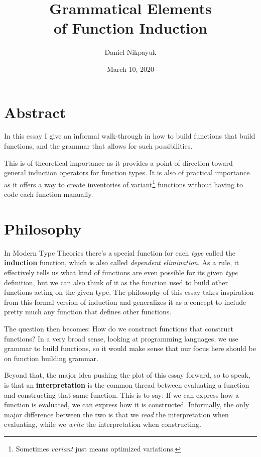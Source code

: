 \documentclass[twoside]{article}
\title{Grammatical Elements\\of Function Induction}
\author{Daniel Nikpayuk}
\date{March 10, 2020}
\newcommand{\strong}[1]{{\bfseries #1}}
\begin{document}
\maketitle
\thispagestyle{empty}

\section*{Abstract}

In this essay I give an informal walk-through in how to build functions that build functions, and the grammar
that allows for such possibilities.

This is of theoretical importance as it provides a point of direction toward general induction operators for function types.
It is also of practical importance as it offers a way to create inventories of variant\footnote{Sometimes \emph{variant}
just means optimized variations.} functions without having to code each function manually.

\section*{Philosophy}

In Modern Type Theories there's a special function for each \emph{type} called the \strong{induction} function, which
is also called \emph{dependent elimination}. As a rule, it effectively tells us what kind of functions are even possible
for its given \emph{type} definition, but we can also think of it as the function used to build other functions acting
on the given type. The philosophy of this essay takes inspiration from this formal version of induction and generalizes
it as a concept to include pretty much any function that defines other functions.

The question then becomes: How do we construct functions that construct functions? In a very broad sense, looking
at programming languages, we use grammar to build functions, so it would make sense that our focus here should be
on function building grammar.

Beyond that, the major idea pushing the plot of this essay forward, so to speak, is that an \strong{interpretation}
is the common thread between evaluating a function and constructing that same function. This is to say: If we can
express how a function is evaluated, we can express how it is constructed. Informally, the only major difference
between the two is that we \emph{read} the interpretation when evaluating, while we \emph{write} the interpretation
when constructing.
\end{document}
